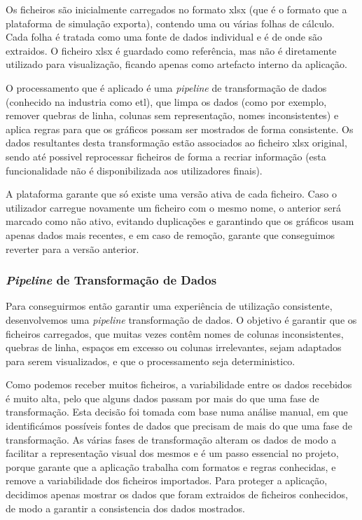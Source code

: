 Os ficheiros são inicialmente carregados no formato \gls{xlsx} (que é o formato que a plataforma de simulação exporta), contendo uma ou várias folhas de cálculo. Cada folha é tratada como uma fonte de dados individual e é de onde são extraidos. O ficheiro \gls{xlsx} é guardado como referência, mas não é diretamente utilizado para visualização, ficando apenas como artefacto interno da aplicação.

O processamento que é aplicado é uma \textit{pipeline} de transformação de dados (conhecido na industria como \gls{etl}), que limpa os dados (como por exemplo, remover quebras de linha, colunas sem representação, nomes inconsistentes) e aplica regras para que os gráficos possam ser mostrados de forma consistente. Os dados resultantes desta transformação estão associados ao ficheiro \gls{xlsx} original, sendo até possivel reprocessar ficheiros de forma a recriar informação (esta funcionalidade não é disponibilizada aos utilizadores finais).

A plataforma garante que só existe uma versão ativa de cada ficheiro. Caso o utilizador carregue novamente um ficheiro com o mesmo nome, o anterior será marcado como não ativo, evitando duplicações e garantindo que os gráficos usam apenas dados mais recentes, e em caso de remoção, garante que conseguimos reverter para a versão anterior.

\subsubsection{\textit{Pipeline} de Transformação de Dados}

Para conseguirmos então garantir uma experiência de utilização consistente, desenvolvemos uma \textit{pipeline} transformação de dados. O objetivo é garantir que os ficheiros carregados, que muitas vezes contêm nomes de colunas inconsistentes, quebras de linha, espaços em excesso ou colunas irrelevantes, sejam adaptados para serem visualizados, e que o processamento seja deterministico.

Como podemos receber muitos ficheiros, a variabilidade entre os dados recebidos é muito alta, pelo que alguns dados passam por mais do que uma fase de transformação. Esta decisão foi tomada com base numa análise manual, em que identificámos possíveis fontes de dados que precisam de mais do que uma fase de transformação. As várias fases de transformação alteram os dados de modo a facilitar a representação visual dos mesmos e é um passo essencial no projeto, porque garante que a aplicação trabalha com formatos e regras conhecidas, e remove a variabilidade dos ficheiros importados. Para proteger a aplicação, decidimos apenas mostrar os dados que foram extraidos de ficheiros conhecidos, de modo a garantir a consistencia dos dados mostrados.

